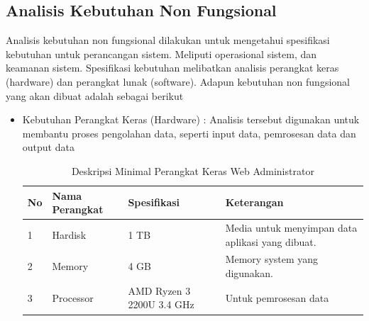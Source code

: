 \subsection{Analisis Kebutuhan Non Fungsional}
Analisis kebutuhan non fungsional dilakukan untuk mengetahui spesifikasi kebutuhan untuk perancangan sistem. Meliputi operasional sistem, dan keamanan sistem. Spesifikasi kebutuhan melibatkan analisis perangkat keras (hardware) dan perangkat lunak (software). Adapun kebutuhan non fungsional yang akan dibuat adalah sebagai berikut
\begin{itemize} 	
	\item Kebutuhan Perangkat Keras (Hardware) : Analisis tersebut digunakan untuk membantu proses pengolahan data, seperti input data, pemrosesan data dan output data
\begin{table}[h!]
\centering
\begin{tabular}{| l | l | p{3cm} | p{3cm} |} 
 \hline
 \textbf{No}   & \textbf{Nama Perangkat} & \textbf{Spesifikasi} &\textbf{Keterangan}\\ 
\hline
1   & Hardisk & 1 TB & Media untuk menyimpan data aplikasi yang dibuat. \\ 
\hline
2   & Memory & 4 GB & Memory system yang digunakan. \\ 
\hline
3   & Processor & AMD Ryzen 3 2200U 3.4 GHz & Untuk pemrosesan data \\ 
 \hline
\end{tabular}
\caption{Deskripsi Minimal Perangkat Keras Web Administrator}
\label{table:2}
\end{table}


\end{itemize}
